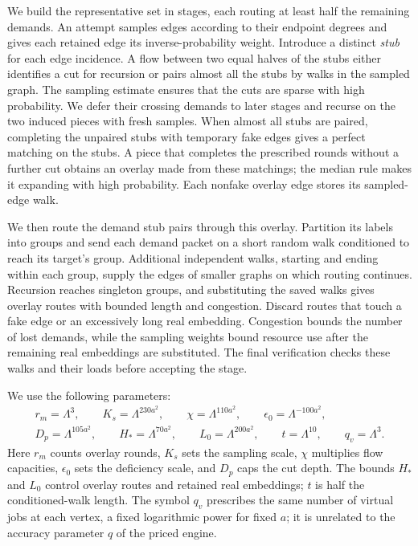 We build the representative set in stages, each routing at least half
the remaining demands.  An attempt samples edges according to their
endpoint degrees and gives each retained edge its inverse-probability
weight.  Introduce a distinct \emph{stub} for each edge incidence.
A flow between two equal halves of the stubs either identifies a cut
for recursion or pairs almost all the stubs by walks in the sampled
graph.  The sampling estimate ensures that the cuts are sparse with
high probability.  We defer their crossing demands to later stages
and recurse on the two induced pieces with fresh samples.  When almost
all stubs are paired, completing the unpaired stubs with temporary fake
edges gives a perfect matching on the stubs.  A piece that completes the
prescribed rounds without a further cut obtains an overlay made from these matchings;
the median rule makes it expanding with high probability.  Each nonfake
overlay edge stores its sampled-edge walk.

We then route the demand stub pairs through this overlay.  Partition its
labels into groups and send each demand packet on a short random walk
conditioned to reach its target's group.  Additional independent walks,
starting and ending within each group, supply the edges of smaller
graphs on which routing continues.  Recursion reaches singleton groups,
and substituting the saved walks gives overlay routes with bounded
length and congestion.  Discard routes that touch a fake edge or an
excessively long real embedding.  Congestion bounds the number of lost
demands, while the sampling weights bound resource use after the
remaining real embeddings are substituted.  The final verification
checks these walks and their loads before accepting the stage.

We use the following parameters:
\begin{equation}\label{route:internal-parameters}
\begin{gathered}
 r_m=\Lambda^3,\qquad K_s=\Lambda^{230a^2},\qquad
 \chi=\Lambda^{110a^2},\qquad \epsilon_0=\Lambda^{-100a^2},\\
 D_p=\Lambda^{105a^2},\qquad H_*=\Lambda^{70a^2},\qquad
 L_0=\Lambda^{200a^2},\qquad t=\Lambda^{10},\qquad q_v=\Lambda^3.
\end{gathered}
\end{equation}
Here $r_m$ counts overlay rounds, $K_s$ sets the sampling scale, $\chi$
multiplies flow capacities, $\epsilon_0$ sets the deficiency scale, and
$D_p$ caps the cut depth.  The bounds $H_*$ and $L_0$ control overlay routes
and retained real embeddings; $t$ is half the conditioned-walk length.
The symbol $q_v$ prescribes the same number of virtual jobs at each vertex,
a fixed logarithmic power for fixed $a$; it is unrelated to the accuracy
parameter $q$ of the priced engine.


